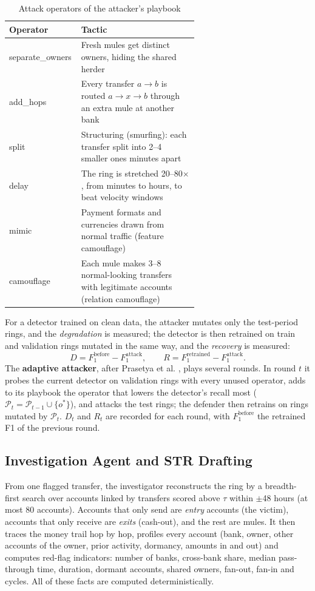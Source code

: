\begin{table}[H]
\centering
\renewcommand{\arraystretch}{1.25}
\begin{tabular}{|l|>{\raggedright\arraybackslash}p{0.62\linewidth}|} \hline
\textbf{Operator} & \textbf{Tactic} \\ \hline
separate\_owners & Fresh mules get distinct owners, hiding the shared herder \\ \hline
add\_hops & Every transfer $a \rightarrow b$ is routed $a \rightarrow x \rightarrow b$ through an extra mule at another bank \\ \hline
split & Structuring (smurfing): each transfer split into 2--4 smaller ones minutes apart \\ \hline
delay & The ring is stretched 20--80$\times$, from minutes to hours, to beat velocity windows \\ \hline
mimic & Payment formats and currencies drawn from normal traffic (feature camouflage) \\ \hline
camouflage & Each mule makes 3--8 normal-looking transfers with legitimate accounts (relation camouflage) \\ \hline
\end{tabular}
\caption{Attack operators of the attacker's playbook}
\label{tab:operators}
\end{table}

For a detector trained on clean data, the attacker mutates only the test-period rings, and the \emph{degradation} is measured; the detector is then retrained on train and validation rings mutated in the same way, and the \emph{recovery} is measured:
\begin{equation}
D = F_1^{\text{before}} - F_1^{\text{attack}}, \qquad R = F_1^{\text{retrained}} - F_1^{\text{attack}}.
\end{equation}
The \textbf{adaptive attacker}, after Prasetya et al. \cite{prasetya2025multi}, plays several rounds. In round $t$ it probes the current detector on validation rings with every unused operator, adds to its playbook the operator that lowers the detector's recall most ($\mathcal{P}_t = \mathcal{P}_{t-1} \cup \{o^*\}$), and attacks the test rings; the defender then retrains on rings mutated by $\mathcal{P}_t$. $D_t$ and $R_t$ are recorded for each round, with $F_1^{\text{before}}$ the retrained F1 of the previous round.

\subsection{Investigation Agent and STR Drafting}
From one flagged transfer, the investigator reconstructs the ring by a breadth-first search over accounts linked by transfers scored above $\tau$ within $\pm$48 hours (at most 80 accounts). Accounts that only send are \emph{entry} accounts (the victim), accounts that only receive are \emph{exits} (cash-out), and the rest are mules. It then traces the money trail hop by hop, profiles every account (bank, owner, other accounts of the owner, prior activity, dormancy, amounts in and out) and computes red-flag indicators: number of banks, cross-bank share, median pass-through time, duration, dormant accounts, shared owners, fan-out, fan-in and cycles. All of these facts are computed deterministically.

